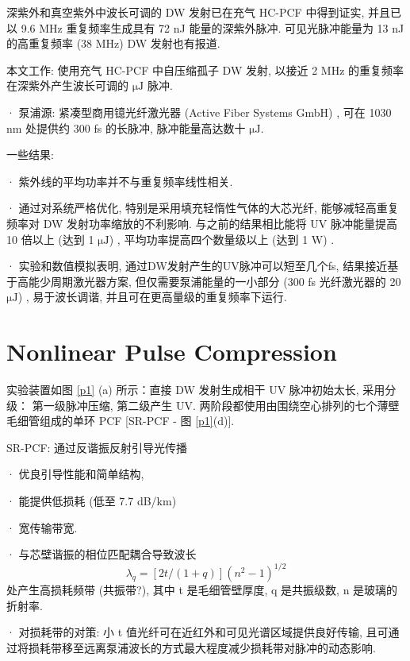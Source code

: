 \documentclass[14pt,a4paper,oneside]{article}
\begin{document}
深紫外和真空紫外中波长可调的 DW 发射已在充气 HC-PCF 中得到证实\cite{jolyBrightSpatiallyCoherent2011, makTunableVacuumUVVisible2013, ermolovSupercontinuumGenerationVacuum2015}, 并且已以 9.6 MHz 重复频率生成具有 72 nJ 能量的深紫外脉冲\cite{kottigHighAveragepowerEnergy2015}. 可见光脉冲能量为 13 nJ 的高重复频率 (38 MHz) DW 发射也有报道\cite{makCompressingMJlevelPulses2015}. 

本文工作: 使用充气 HC-PCF 中自压缩孤子 DW 发射, 以接近 2 MHz 的重复频率在深紫外产生波长可调的 $\mathrm{\mu J}$ 脉冲. 

· 泵浦源: 紧凑型商用镱光纤激光器 (Active Fiber Systems GmbH) , 可在 1030 nm 处提供约 300 fs 的长脉冲, 脉冲能量高达数十 $\mathrm{\mu J}$. 

一些结果: 

· 紫外线的平均功率并不与重复频率线性相关. 

· 通过对系统严格优化, 特别是采用填充轻惰性气体的大芯光纤, 能够减轻高重复频率对 DW 发射功率缩放的不利影响. 与之前的结果相比能将 UV 脉冲能量提高 10 倍以上 (达到 1 $\mathrm{\mu J}$) , 平均功率提高四个数量级以上 (达到 1 W) . 

· 实验和数值模拟表明, 通过DW发射产生的UV脉冲可以短至几个fs, 结果接近基于高能少周期激光器方案, 但仅需要泵浦能量的一小部分 (300 fs 光纤激光器的 20 $\mathrm{\mu J}$) , 易于波长调谐, 并且可在更高量级的重复频率下运行. 


\section{Nonlinear Pulse Compression}

实验装置如图 \ref{p1} (a) 所示：直接 DW 发射生成相干 UV 脉冲初始太长, 采用分级： 第一级脉冲压缩, 第二级产生 UV. 两阶段都使用由围绕空心排列的七个薄壁毛细管组成的单环 PCF [SR-PCF - 图 \ref{p1}(d)].  

SR-PCF: 通过反谐振反射引导光传播

· 优良引导性能和简单结构,  

· 能提供低损耗 (低至 7.7 dB/km\cite{debordUltralowTransmissionLoss2017}) 

· 宽传输带宽. 

· 与芯壁谐振的相位匹配耦合导致波长
\begin{equation}
    \lambda_{q}=[2t/(1+q)](n^{2}-1)^{1/2}
    \label{eq:1}
\end{equation}
处产生高损耗频带 (共振带?), 其中 t 是毛细管壁厚度, q 是共振级数, n 是玻璃的折射率\cite{uebelBroadbandRobustlySinglemode2016}. 

· 对损耗带的对策: 小 t 值光纤可在近红外和可见光谱区域提供良好传输, 且可通过将损耗带移至远离泵浦波长的方式最大程度减少损耗带对脉冲的动态影响. 
\end{document}
